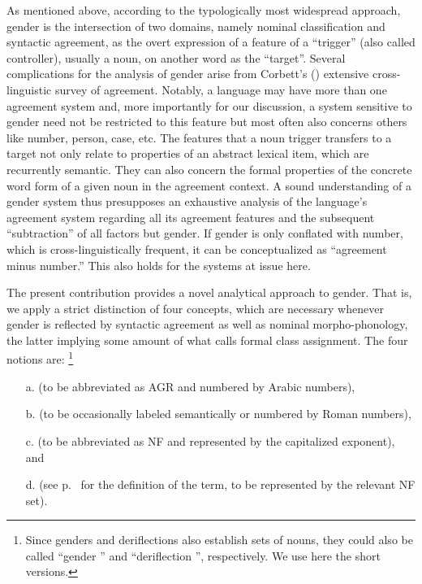 \documentclass[output=collectionpaper]{langsci/langscibook}
\begin{document}
As mentioned above, according to the typologically most widespread approach, gender is the intersection of two domains, namely nominal classification and syntactic agreement, as the overt expression of a feature of a ``trigger'' (also called controller), usually a noun, on another word as the ``target''. Several complications for the analysis of gender arise from Corbett's (\citeyear{Corbett2006}) extensive cross-linguistic survey of agreement. Notably, a language may have more than one agreement system and, more importantly for our discussion, a system sensitive to gender need not be restricted to this feature but most often also concerns others like number, person, case, etc. The features that a noun trigger transfers to a target not only relate to properties of an abstract lexical item, which are recurrently semantic. They can also concern the formal properties of the concrete word form of a given noun in the agreement context. A sound understanding of a gender system thus presupposes an exhaustive analysis of the language's agreement system regarding all its agreement features and the subsequent ``subtraction'' of all factors but gender. If gender is only conflated with number, which is cross-linguistically frequent, it can be conceptualized as ``agreement minus number.'' This also holds for the  systems at issue here.

The present contribution provides a novel analytical approach to gender. That is, we apply a strict distinction of four concepts, which are necessary whenever gender is reflected by syntactic agreement as well as nominal morpho-phonology, the latter implying some amount of what \citet{Corbett1991} calls formal class assignment. The four notions are:%
\footnote{Since genders and deriflections also establish sets of nouns, they could also be called ``gender '' and ``deriflection '', respectively. We use here the short versions.}

\begin{enumerate}
\item[a.]  (to be abbreviated as AGR and numbered by Arabic numbers),

\item[b.]  (to be occasionally labeled semantically or numbered by Roman numbers),

\item[c.]   (to be abbreviated as NF and represented by the capitalized exponent), and

\item[d.]  (see p.~\pageref{page:Gueld:def} for the definition of the term, to be represented by the relevant NF set).
\end{enumerate}
\end{document}
